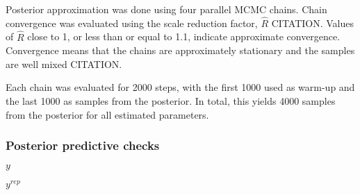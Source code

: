 \documentclass[12pt,letterpaper]{article}
\begin{document}
Posterior approximation was done using four parallel MCMC chains. Chain convergence was evaluated using the scale reduction factor, \(\hat{R}\) CITATION. Values of \(\hat{R}\) close to 1, or less than or equal to 1.1, indicate approximate convergence. Convergence means that the chains are approximately stationary and the samples are well mixed CITATION.

Each chain was evaluated for 2000 steps, with the first 1000 used as warm-up and the last 1000 as samples from the posterior. In total, this yields 4000 samples from the posterior for all estimated parameters. 


\subsubsection{Posterior predictive checks}

\(y\)

\(y^{rep}\)
\end{document}
